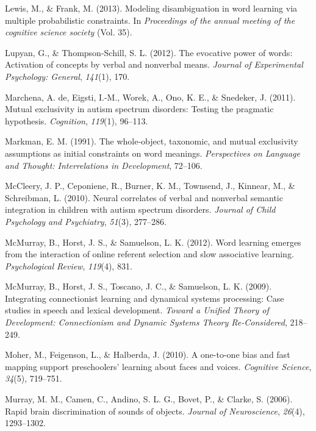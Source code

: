 \documentclass[english,floatsintext,man]{apa6}
\theoremstyle{definition}
\theoremstyle{definition}
\theoremstyle{definition}
\theoremstyle{remark}
\begin{document}
\leavevmode\hypertarget{ref-lewis2013modeling}{}%
Lewis, M., \& Frank, M. (2013). Modeling disambiguation in word learning
via multiple probabilistic constraints. In \emph{Proceedings of the
annual meeting of the cognitive science society} (Vol. 35).

\leavevmode\hypertarget{ref-lupyan2012evocative}{}%
Lupyan, G., \& Thompson-Schill, S. L. (2012). The evocative power of
words: Activation of concepts by verbal and nonverbal means.
\emph{Journal of Experimental Psychology: General}, \emph{141}(1), 170.

\leavevmode\hypertarget{ref-de2011mutual}{}%
Marchena, A. de, Eigsti, I.-M., Worek, A., Ono, K. E., \& Snedeker, J.
(2011). Mutual exclusivity in autism spectrum disorders: Testing the
pragmatic hypothesis. \emph{Cognition}, \emph{119}(1), 96--113.

\leavevmode\hypertarget{ref-markman1991whole}{}%
Markman, E. M. (1991). The whole-object, taxonomic, and mutual
exclusivity assumptions as initial constraints on word meanings.
\emph{Perspectives on Language and Thought: Interrelations in
Development}, 72--106.

\leavevmode\hypertarget{ref-mccleery2010neural}{}%
McCleery, J. P., Ceponiene, R., Burner, K. M., Townsend, J., Kinnear,
M., \& Schreibman, L. (2010). Neural correlates of verbal and nonverbal
semantic integration in children with autism spectrum disorders.
\emph{Journal of Child Psychology and Psychiatry}, \emph{51}(3),
277--286.

\leavevmode\hypertarget{ref-mcmurray2012word}{}%
McMurray, B., Horst, J. S., \& Samuelson, L. K. (2012). Word learning
emerges from the interaction of online referent selection and slow
associative learning. \emph{Psychological Review}, \emph{119}(4), 831.

\leavevmode\hypertarget{ref-mcmurray2009integrating}{}%
McMurray, B., Horst, J. S., Toscano, J. C., \& Samuelson, L. K. (2009).
Integrating connectionist learning and dynamical systems processing:
Case studies in speech and lexical development. \emph{Toward a Unified
Theory of Development: Connectionism and Dynamic Systems Theory
Re-Considered}, 218--249.

\leavevmode\hypertarget{ref-moher2010one}{}%
Moher, M., Feigenson, L., \& Halberda, J. (2010). A one-to-one bias and
fast mapping support preschoolers' learning about faces and voices.
\emph{Cognitive Science}, \emph{34}(5), 719--751.

\leavevmode\hypertarget{ref-murray2006rapid}{}%
Murray, M. M., Camen, C., Andino, S. L. G., Bovet, P., \& Clarke, S.
(2006). Rapid brain discrimination of sounds of objects. \emph{Journal
of Neuroscience}, \emph{26}(4), 1293--1302.
\end{document}
